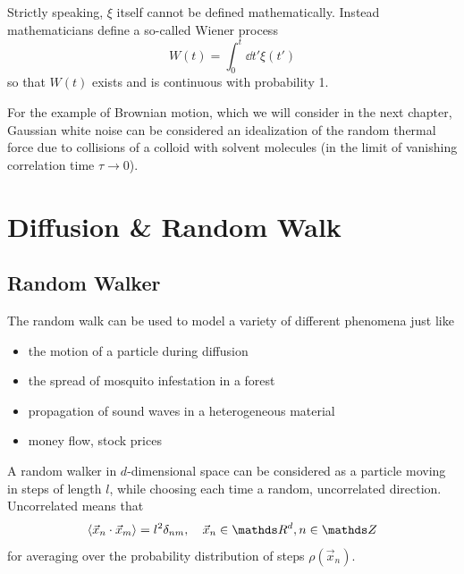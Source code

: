 \documentclass{notebook}
\begin{document}
\begin{remark}
	Strictly speaking, $\xi$ itself cannot be defined mathematically. Instead mathematicians define a so-called Wiener process 
	\begin{equation}
	W(t) = \int_0^t{\dd{t'} \xi(t')}
	\end{equation}
	so that $W(t)$ exists and is continuous with probability 1.
\end{remark}

For the example of Brownian motion, which we will consider in the next chapter, Gaussian white noise can be considered an idealization of the random thermal force due to collisions of a colloid with solvent molecules (in the limit of vanishing correlation time $\tau \to 0$). 


\chapter{Diffusion \& Random Walk}

\section{Random Walker}

The random walk can be used to model a variety of different phenomena just like
%
\begin{itemize}
	\item{the motion of a particle during diffusion}
	\item{the spread of mosquito infestation in a forest}
	\item{propagation of sound waves in a heterogeneous material}
	\item{money flow, stock prices}
\end{itemize}
%

%
\begin{theorem}
	A random walker in $d$-dimensional space can be considered as a particle moving in steps of length $l$, while choosing each time a random, uncorrelated direction. Uncorrelated means that
	\begin{equation}
	\expval{\vec{x}_n \cdot \vec{x}_m} = l^2 \delta_{nm}, \quad \vec{x}_n \in \R^d, n \in \Z
	\end{equation}
	for averaging over the probability distribution of steps $\rho(\vec{x}_n)$.
\end{theorem}
%
\end{document}
